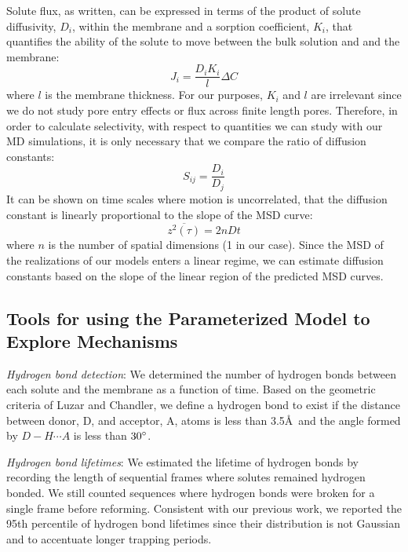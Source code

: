 \documentclass[journal=jpcbfk,manuscript=article]{achemso}
\begin{document}
  Solute flux, as written, can be expressed in terms of the product of solute 
  diffusivity, $D_i$, within the membrane and a sorption coefficient, $K_i$, 
  that quantifies the ability of the solute to move between the bulk solution
  and and the membrane:
  \begin{equation}
    J_i = \frac{D_i K_i}{l}\Delta C
  \end{equation}
  where $l$ is the membrane thickness. For our purposes, $K_i$ and $l$ are 
  irrelevant since we do not study pore entry effects or flux across finite
  length pores. Therefore, in order to calculate selectivity, with respect
  to quantities we can study with our MD simulations, it is only necessary that
  we compare the ratio of diffusion constants:
  \begin{equation}
    S_{ij} = \frac{D_i}{D_j}
    \label{eqn:selectivity_diffusivity}
  \end{equation}
  It can be shown on time scales where motion is uncorrelated, that the diffusion
  constant is linearly proportional to the slope of the MSD curve:~\cite{einstein_investigations_1956}
  \begin{equation}
    \overline{z^2(\tau)} = 2 n D t
    \label{eqn:msd_D}
  \end{equation}
  where $n$ is the number of spatial dimensions (1 in our case). Since the MSD
  of the realizations of our models enters a linear regime, we can estimate 
  diffusion constants 
  based on the slope of the linear region of the predicted MSD curves. 

  \subsection{Tools for using the Parameterized Model to Explore Mechanisms}\label{method:interactions}
  
  \textit{Hydrogen bond detection}: We determined the number of hydrogen bonds 
  between each solute and the membrane as a function of time. Based on the 
  geometric criteria of Luzar and Chandler, we define a hydrogen bond to exist 
  if the distance between donor, D, and acceptor, A, atoms is less than 
  3.5\AA~and the angle formed by $D-H \cdots A$ is less than $30\degree$.~\cite{luzar_effect_1996}
  
  \textit{Hydrogen bond lifetimes}: We estimated the lifetime of hydrogen bonds by 
  recording the length of sequential frames where solutes remained hydrogen bonded.
  We still counted sequences where hydrogen bonds were broken for a single frame 
  before reforming. Consistent with our previous work, we reported the 95th 
  percentile of hydrogen bond lifetimes since their distribution is not Gaussian
  and to accentuate longer trapping periods.~\cite{coscia_chemically_2019}
  
\end{document}
